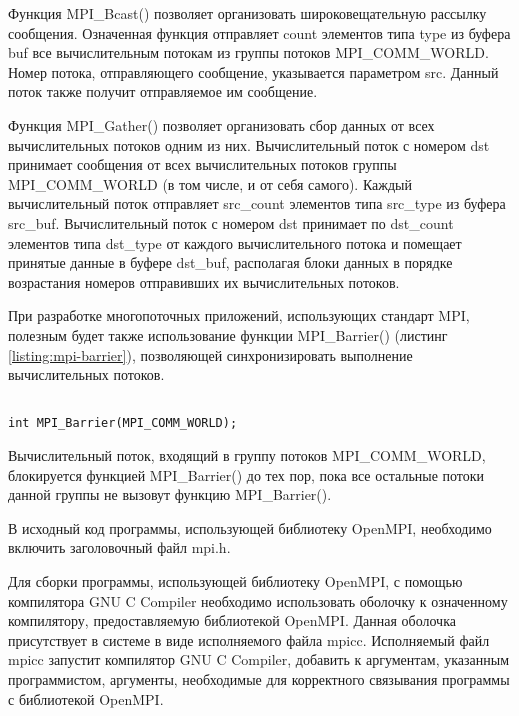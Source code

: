 \begin{itemize}
\begin{lstlisting}
\end{lstlisting}
\mylistingend

	Функция MPI\_Bcast() позволяет организовать широковещательную рассылку сообщения. Означенная функция отправляет count элементов типа type из буфера buf все вычислительным потокам из группы потоков MPI\_COMM\_WORLD. Номер потока, отправляющего сообщение, указывается параметром src. Данный поток также получит отправляемое им сообщение.
	
	Функция MPI\_Gather() позволяет организовать сбор данных от всех вычислительных потоков одним из них. Вычислительный поток с номером dst принимает сообщения от всех вычислительных потоков группы MPI\_COMM\_WORLD (в том числе, и от себя самого). Каждый вычислительный поток отправляет src\_count элементов типа src\_type из буфера src\_buf. Вычислительный поток с номером dst принимает по dst\_count элементов типа dst\_type от каждого вычислительного потока и помещает принятые данные в буфере dst\_buf, располагая блоки данных в порядке возрастания номеров отправивших их вычислительных потоков.

\end{itemize}

При разработке многопоточных приложений, использующих стандарт MPI, полезным будет также использование функции MPI\_Barrier() (листинг \ref{listing:mpi-barrier}), позволяющей синхронизировать выполнение вычислительных потоков.

\begin{lstlisting}

int MPI_Barrier(MPI_COMM_WORLD);

\end{lstlisting}
\mylistingend

Вычислительный поток, входящий в группу потоков MPI\_COMM\_WORLD, блокируется функцией MPI\_Barrier() до тех пор, пока все остальные потоки данной группы не вызовут функцию MPI\_Barrier().


В исходный код программы, использующей библиотеку OpenMPI, необходимо включить заголовочный файл mpi.h.

Для сборки программы, использующей библиотеку OpenMPI, с помощью компилятора GNU C Compiler необходимо использовать оболочку к означенному компилятору, предоставляемую библиотекой OpenMPI. Данная оболочка присутствует в системе в виде исполняемого файла mpicc. Исполняемый файл mpicc запустит компилятор GNU C Compiler, добавить к аргументам, указанным программистом, аргументы, необходимые для корректного связывания программы с библиотекой OpenMPI.

